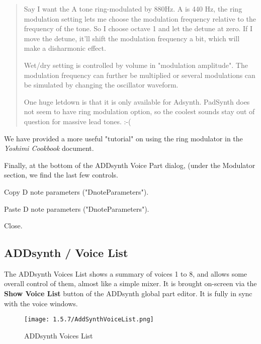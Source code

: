    \begin{quotation}
      Say I want the A tone ring-modulated by 880Hz. A is 440 Hz, the ring
      modulation setting lets me choose the modulation frequency relative
      to the frequency of the tone. So I choose octave 1 and let the
      detune at zero. If I move the detune, it'll shift the modulation
      frequency a bit, which will make a disharmonic effect.

      Wet/dry setting is controlled by volume in "modulation amplitude".
      The modulation frequency can further be multiplied or several
      modulations can be simulated by changing the oscillator waveform.

      One huge letdown is that it is only available for Adsynth. PadSynth
      does not seem to have ring modulation option, so the coolest sounds
      stay out of question for massive lead tones. :-(
   \end{quotation}

   We have provided a more useful "tutorial" on using the ring modulator in the
   \textsl{Yoshimi Cookbook} \cite{cookbook} document.

   Finally, at the bottom of the ADDsynth Voice Part dialog, (under the Modulator
   section, we find the last few controls.

   \setcounter{ItemCounter}{0}      %

   Copy D note parameters ("DnoteParameters").

   Paste D note parameters ("DnoteParameters").

   Close.


\subsection{ADDsynth / Voice List}
\label{subsec:addsynth_voice_list}

   The ADDsynth Voices List shows a summary of voices 1 to 8, and allows
   some overall control of them, almost like a simple mixer.
   It is brought on-screen via the \textbf{Show Voice List} button
   of the ADDsynth global part editor.
   It is fully in sync with the voice windows.

\begin{figure}[H]
   \centering
   \texttt{[image: 1.5.7/AddSynthVoiceList.png]}
   \caption{ADDsynth Voices List}
   \label{fig:addsynth_voices_list}
\end{figure}

